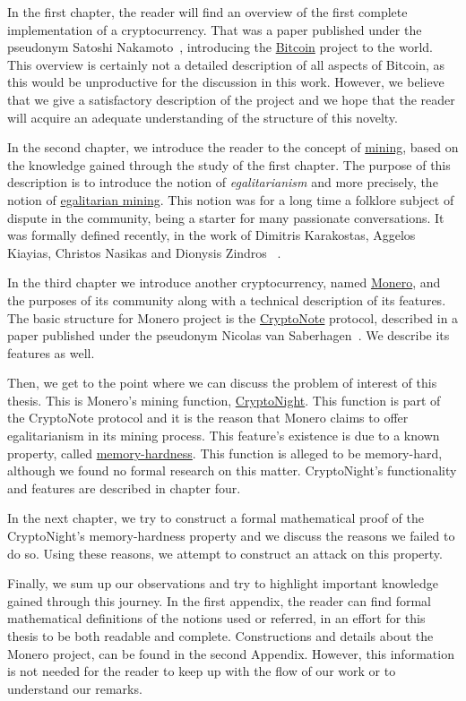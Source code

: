 In the first chapter, the reader will find an overview of the first complete implementation of a cryptocurrency. That was a paper published under the pseudonym Satoshi Nakamoto~\cite{Nakamoto_bitcoin:a}, introducing the \hyperref[sec:Bitcoin]{Bitcoin} project to the world. This overview is certainly not a detailed description of all aspects of Bitcoin, as this would be unproductive for the discussion in this work. However, we believe that we give a satisfactory description of the project and we hope that the reader will acquire an adequate understanding of the structure of this novelty.

In the second chapter, we introduce the reader to the concept of \hyperref[sec:mining]{mining}, based on the knowledge gained through the study of the first chapter. The purpose of this description is to introduce the notion of \emph{egalitarianism} and more precisely, the notion of \hyperref[sec:egalitarian]{egalitarian mining}. This notion was for a long time a folklore subject of dispute in the community, being a starter for many passionate conversations. It was formally defined recently, in the work of Dimitris Karakostas, Aggelos Kiayias, Christos Nasikas and Dionysis Zindros ~\cite{egalitarianism}.
\pagebreak

In the third chapter we introduce another cryptocurrency, named \hyperref[sec:Monero]{Monero}, and the purposes of its community along with a technical description of its features. The basic structure for Monero project is the \hyperref[sec:CryptoNote]{CryptoNote} protocol, described in a paper published under the pseudonym Nicolas van Saberhagen~\cite{citeulike:14139412}. We describe its features as well.

Then, we get to the point where we can discuss the problem of interest of this thesis. This is Monero's mining function, \hyperref[ch:cryptonight]{CryptoNight}. This function is part of the CryptoNote protocol and it is the reason that Monero claims to offer egalitarianism in its mining process. This feature's existence is due to a known property, called \hyperref[sec:memory-hard]{memory-hardness}. This function is alleged to be memory-hard, although we found no formal research on this matter. CryptoNight's functionality and features are described in chapter four.

In the next chapter, we try to construct a formal mathematical proof of the CryptoNight's memory-hardness property and we discuss the reasons we failed to do so. Using these reasons, we attempt to construct an attack on this property.

Finally, we sum up our observations and try to highlight important knowledge gained through this journey. In the first appendix, the reader can find formal mathematical definitions of the notions used or referred, in an effort for this thesis to be both readable and complete. Constructions and details about the Monero project, can be found in the second Appendix. However, this information is not needed for the reader to keep up with the flow of our work or to understand our remarks.
